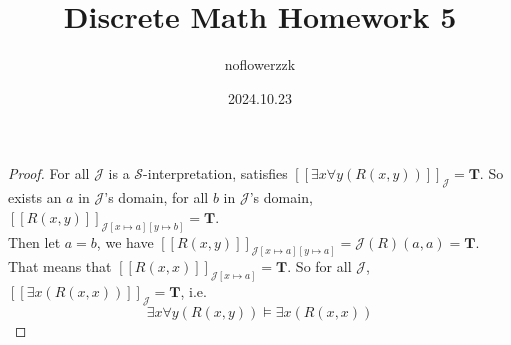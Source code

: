 \documentclass{article}
\title{Discrete Math Homework 5}
\author{noflowerzzk}
\date{2024.10.23}
\begin{document}
\maketitle

\section{}

\begin{proof}
    For all $\mathcal{J}$ is a $\mathcal{S}$-interpretation, satisfies 
    $[\![\exists x \forall y (R(x, y))]\!]_\mathcal{J} = \mathbf{T}$. So exists an $a$ in $\mathcal{J}$'s domain,  for all $b$ in $\mathcal{J}$'s domain, $[\![R(x, y)]\!]_{\mathcal{J}[x \mapsto a][y \mapsto b]} = \mathbf{T}$. \\
    Then let $a = b$, we have $[\![R(x, y)]\!]_{\mathcal{J}[x \mapsto a][y \mapsto a]} = \mathcal{J}(R)(a, a) = \mathbf{T}$. That means that $[\![R(x, x)]\!]_{\mathcal{J}[x \mapsto a]} = \mathbf{T}$.
    So for all $\mathcal{J}$, $[\![\exists x(R(x, x))]\!]_{\mathcal{J}} = \mathbf{T}$, i.e. 
    \[
        \exists x \forall y (R(x, y)) \models \exists x(R(x, x))
    \]
\end{proof}
\end{document}
